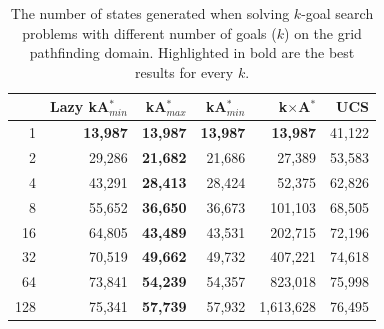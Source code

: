 \documentclass{aicom2e}
\newcommand{\kgs}{$k$-goal search}
\newcommand{\kastarmin}{kA$^*_{min}$}
\newcommand{\kastarmax}{kA$^*_{max}$}
\newcommand{\kxastar}{k$\times$A$^*$}
\begin{document}
\begin{table}[]
    \centering
    \begin{tabular}{|r|r|r|r|r|r|}
    \hline
        & \multicolumn{1}{c|}{Lazy \kastarmin{}} & \kastarmax &      \kastarmin       &  \kxastar & UCS       \\

        \hline
1                         & \textbf{13,987}                      & \textbf{13,987}           & \textbf{13,987}           & \textbf{13,987}                 & 41,122                      \\
2                         & 29,286                               & \textbf{21,682}           & 21,686                    & 27,389                          & 53,583                      \\
4                         & 43,291                               & \textbf{28,413}           & 28,424                    & 52,375                          & 62,826                      \\
8                         & 55,652                               & \textbf{36,650}           & 36,673                    & 101,103                         & 68,505                      \\
16                        & 64,805                               & \textbf{43,489}           & 43,531                    & 202,715                         & 72,196                      \\
32                        & 70,519                               & \textbf{49,662}           & 49,732                    & 407,221                         & 74,618                      \\
64                        & 73,841                               & \textbf{54,239}           & 54,357                    & 823,018                         & 75,998                      \\
128                       & 75,341                               & \textbf{57,739}           & 57,932                    & 1,613,628                       & 76,495\\
\hline
    \end{tabular}
    \caption{The number of states generated when solving \kgs{} problems with different number of goals ($k$) on the grid pathfinding domain. Highlighted in bold are the best results for every $k$.}
    \label{tab:pathfinding-generated}
\end{table}


\end{document}

